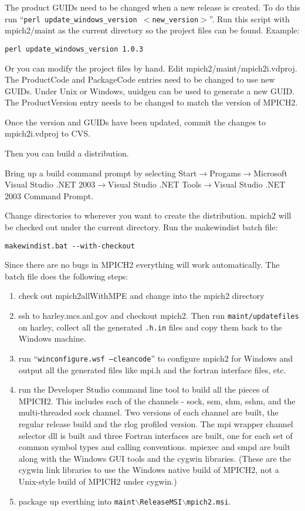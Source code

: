 \documentclass[dvipdfm,11pt]{article}
\begin{document}
The product GUIDs need to be changed when a new release is created.  To do this run 
``\texttt{perl update\_windows\_version $<$new\_version$>$}''.  Run this script with mpich2/maint 
as the current directory so the project files can be found.  Example:
\begin{verbatim}
perl update_windows_version 1.0.3
\end{verbatim}

Or you can modify the project files by hand.  Edit mpich2/maint/mpich2i.vdproj.  The ProductCode
and PackageCode entries need to be changed to use new GUIDs.  Under Unix or Windows, uuidgen can 
be used to generate a new GUID.  The ProductVersion entry needs to be changed to match the 
version of MPICH2.

Once the version and GUIDs have been updated, commit the changes to mpich2i.vdproj to CVS.

Then you can build a distribution.

Bring up a build command prompt by selecting Start$\to$Progams$\to$Microsoft Visual Studio 
.NET 2003$\to$Visual Studio .NET Tools$\to$Visual Studio .NET 2003 Command Prompt.

Change directories to wherever you want to create the distribution.  mpich2 will be checked 
out under the current directory.  Run the makewindist batch file:

\begin{verbatim}
makewindist.bat --with-checkout
\end{verbatim}

Since there are no bugs in MPICH2 everything will work automatically.  The batch file does the
following steps:
\begin{enumerate}
\item check out mpich2allWithMPE and change into the mpich2 directory
\item ssh to harley.mcs.anl.gov and checkout mpich2.  Then run \texttt{maint/updatefiles} on
harley, collect all the generated \texttt{.h.in} files and copy them back to the Windows
machine.
\item run ``\texttt{winconfigure.wsf --cleancode}'' to configure mpich2 for Windows and output
all the generated files like mpi.h and the fortran interface files, etc.
\item run the Developer Studio command line tool to build all the pieces of MPICH2.  This
includes each of the channels - sock, ssm, shm, sshm, and the multi-threaded sock
channel.  Two versions of each channel are built, the regular release build and the rlog
profiled version.  The mpi wrapper channel selector dll is built and three Fortran interfaces
are built, one for each set of common symbol types and calling conventions.  mpiexec and
smpd are built along with the Windows GUI tools and the cygwin libraries.  (These are the cygwin
link libraries to use the Windows native build of MPICH2, not a Unix-style build of MPICH2
under cygwin.)
\item package up everthing into \texttt{maint$\backslash$ReleaseMSI$\backslash$mpich2.msi}.
\end{enumerate}
\end{document}
